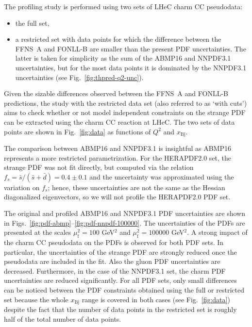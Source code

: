 \documentclass[pdftex,twocolumn,epjc3]{svjour3}          %
\newcommand{\abmp} {ABMP16\xspace}
\newcommand{\nnpdf} {NNPDF3.1\xspace}
\newcommand{\xbj}{\ensuremath{x_{\text{Bj}}}\xspace}
\newcommand{\fonll} {{FONLL-B}\xspace}
\newcommand{\ffns} {{FFNS~A}\xspace}
\newcommand\new[1]{{\color{blue} #1}}
\renewcommand\new[1]{{ #1}}
\begin{document}
\new{
The profiling study is performed using two sets of LHeC charm CC pseudodata:
\begin{itemize}
 \item the full set,
 \item a restricted set with data points for which the difference between the \ffns and \fonll are smaller than the present PDF uncertainties. 
 The latter is taken for simplicity as the sum of the \abmp and \nnpdf uncertainties, but for the most data points it is dominated by the \nnpdf uncertainties (see Fig.~\ref{fig:thpred-q2-unc}).
\end{itemize}
Given the sizable differences observed between the \ffns and \fonll predictions, the study with the restricted data set (also referred to as `with cuts') aims to check whether or not model independent constraints on the strange PDF can be extracted using the charm CC reaction at LHeC. The two sets of data points are shown in Fig.~\ref{fig:data} as functions of $Q^2$ and \xbj.
}

%
The comparison between  \abmp  and \nnpdf is insightful as \abmp represents a more restricted parametrization.
%
For the HERAPDF2.0 set, the strange PDF was not fit directly, but computed via the relation
$f_s = \bar{s}/(\bar{s}+\bar{d})=0.4\pm 0.1$ and the uncertainty was approximated using the variation on $f_s$;
hence, these uncertainties are not the same as the Hessian diagonalized eigenvectors, so we will not
profile the HERAPDF2.0 PDF set.




The original and profiled \abmp and \nnpdf PDF uncertainties are shown
in Figs.~\ref{fig:pdf-abmp}--\ref{fig:pdf-nnpdf-100000}.  The
uncertainties of the PDFs are presented at the scales
$\mu_\mathrm{f}^2=100$ GeV$^2$ and $\mu_\mathrm{f}^2=100000$ GeV$^2$.
A strong impact of the charm CC pseudodata on the PDFs is observed for
both PDF sets.  In particular, the uncertainties of the strange PDF
are strongly reduced once the pseudodata are included in the fit.
Also the gluon PDF uncertainties are decreased. Furthermore, in the
case of the NNPDF3.1 set, the charm PDF uncertainties are reduced
significantly.
%
\new{For all PDF sets, only small differences can be noticed 
between the PDF constraints obtained using the full or restricted set 
because the whole \xbj range is covered in both cases (see Fig.~\ref{fig:data}) 
despite the fact that the number of data points in the restricted set
is roughly half of the  total number of data points.}
\end{document}
